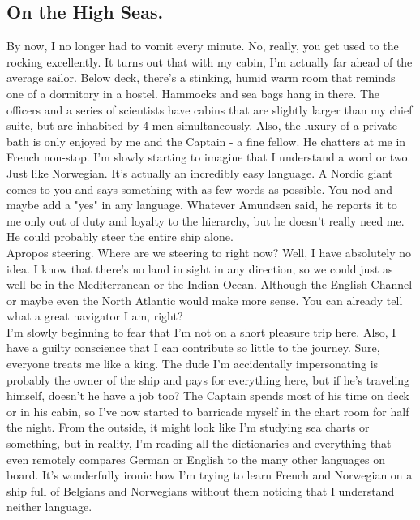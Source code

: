 \documentclass{article}
\begin{document}
  \subsection{On the High Seas.}
  \noindent By now, I no longer had to vomit every minute. No, really, you get used to the rocking excellently. It turns
  out
  that with my cabin, I'm actually far ahead of the average sailor. Below deck, there's a stinking, humid warm
  room
  that reminds one of a dormitory in a hostel. Hammocks and sea bags hang in there. The officers and a series of
  scientists have cabins that are slightly larger than my chief suite, but are inhabited by 4 men simultaneously.
  Also, the luxury of a private bath is only enjoyed by me and the Captain - a fine fellow. He chatters at me in
  French non-stop. I'm slowly starting to imagine that I understand a word or two. Just like Norwegian. It's
  actually an incredibly easy language. A Nordic giant comes to you and says something with as few words as
  possible. You nod and maybe add a "yes" in any language. Whatever Amundsen said, he reports it to me only out of
  duty and loyalty to the hierarchy, but he doesn't really need me. He could probably steer the entire ship alone.
  \\
  \noindent Apropos steering. Where are we steering to right now? Well, I have absolutely no idea. I know that there's no
  land in sight in any direction, so we could just as well be in the Mediterranean or the Indian Ocean. Although
  the
  English Channel or maybe even the North Atlantic would make more sense. You can already tell what a great
  navigator I am, right?\\
  \noindent I'm slowly beginning to fear that I'm not on a short pleasure trip here. Also, I have a guilty conscience that
  I
  can contribute so little to the journey. Sure, everyone treats me like a king. The dude I'm accidentally
  impersonating is probably the owner of the ship and pays for everything here, but if he's traveling himself,
  doesn't he have a job too? The Captain spends most of his time on deck or in his cabin, so I've now started to
  barricade myself in the chart room for half the night. From the outside, it might look like I'm studying sea
  charts or something, but in reality, I'm reading all the dictionaries and everything that even remotely compares
  German or English to the many other languages on board. It's wonderfully ironic how I'm trying to learn French
  and
  Norwegian on a ship full of Belgians and Norwegians without them noticing that I understand neither language.
\end{document}
